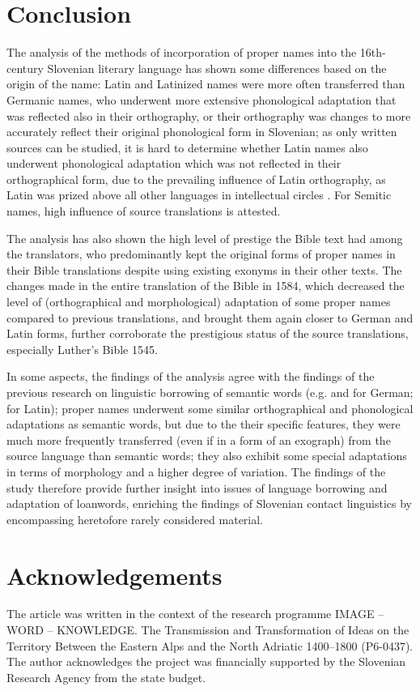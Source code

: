 \documentclass[output=paper,colorlinks,citecolor=brown,arabicfont,chinesefont]{langscibook}
\begin{document}
\section{Conclusion}

The analysis of the methods of incorporation of proper names into the 16th-century Slovenian literary language has shown some differences based on the origin of the name: Latin and Latinized names were more often transferred than Germanic names, who underwent more extensive phonological adaptation that was reflected also in their orthography, or their orthography was changes to more accurately reflect their original phonological form in Slovenian; as only written sources can be studied, it is hard to determine whether Latin names also underwent phonological adaptation which was not reflected in their orthographical form, due to the prevailing influence of Latin orthography, as Latin was prized above all other languages in intellectual circles \citep[23]{Ahacic2014}. For Semitic names, high influence of source translations is attested.

The analysis has also shown the high level of prestige the Bible text had among the translators, who predominantly kept the original forms of proper names in their Bible translations despite using existing exonyms in their other texts. The changes made in the entire translation of the Bible in 1584, which decreased the level of (orthographical and morphological) adaptation of some proper names compared to previous translations, and brought them again closer to German and Latin forms, further corroborate the prestigious status of the source translations, especially Luther’s Bible 1545.

In some aspects, the findings of the analysis agree with the findings of the previous research on linguistic borrowing of semantic words (e.g. \citealt{Striedter-temps1963}  and \citealt{Legan_ravnikar2012}  for German; \citealt{Ahacic2011} for Latin); proper names underwent some similar orthographical and phonological adaptations as semantic words, but due to the their specific features, they were much more frequently transferred (even if in a form of an exograph) from the source language  than semantic words; they also exhibit some special adaptations in terms of morphology and a higher degree of variation. The findings of the study therefore provide further insight into issues of language borrowing and adaptation of loanwords, enriching the findings of Slovenian contact linguistics by encompassing heretofore rarely considered material.

\section*{Acknowledgements}
The article was written in the context of the research programme IMAGE – WORD – KNOWLEDGE. The Transmission and Transformation of Ideas on the Territory Between the Eastern Alps and the North Adriatic 1400--1800 (P6-0437). The author acknowledges the project was financially supported by the Slovenian Research Agency from the state budget. 


{\sloppy\printbibliography[heading=subbibliography,notkeyword=this]}
\end{document}
